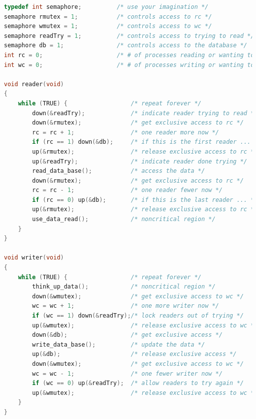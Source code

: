 \documentclass[12pt]{article}
\begin{document}
\begin{lstlisting}[language=C, caption=writers-preference]
typedef int semaphore;          /* use your imagination */
semaphore rmutex = 1;           /* controls access to rc */
semaphore wmutex = 1;           /* controls access to wc */
semaphore readTry = 1;          /* controls access to trying to read */
semaphore db = 1;               /* controls access to the database */
int rc = 0;                     /* # of processes reading or wanting to */
int wc = 0;                     /* # of processes writing or wanting to */

void reader(void)
{
    while (TRUE) {                  /* repeat forever */
        down(&readTry);             /* indicate reader trying to read */
        down(&rmutex);              /* get exclusive access to rc */
        rc = rc + 1;                /* one reader more now */
        if (rc == 1) down(&db);     /* if this is the first reader ... */
        up(&rmutex);                /* release exclusive access to rc */
        up(&readTry);               /* indicate reader done trying */
        read_data_base();           /* access the data */
        down(&rmutex);              /* get exclusive access to rc */
        rc = rc - 1;                /* one reader fewer now */
        if (rc == 0) up(&db);       /* if this is the last reader ... */
        up(&rmutex);                /* release exclusive access to rc */
        use_data_read();            /* noncritical region */
    }
}

void writer(void)
{
    while (TRUE) {                  /* repeat forever */
        think_up_data();            /* noncritical region */
        down(&wmutex);              /* get exclusive access to wc */
        wc = wc + 1;                /* one more writer now */
        if (wc == 1) down(&readTry);/* lock readers out of trying */
        up(&wmutex);                /* release exclusive access to wc */
        down(&db);                  /* get exclusive access */
        write_data_base();          /* update the data */
        up(&db);                    /* release exclusive access */
        down(&wmutex);              /* get exclusive access to wc */
        wc = wc - 1;                /* one fewer writer now */
        if (wc == 0) up(&readTry);  /* allow readers to try again */
        up(&wmutex);                /* release exclusive access to wc */
    }
}
\end{lstlisting}




 
\end{document}
